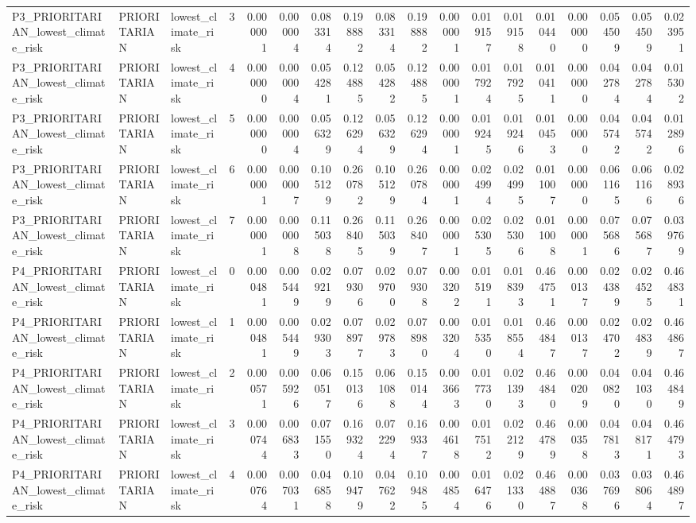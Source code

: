 \begin{tabular}{lllrrrrrrrrrrrrrrr}
P3_PRIORITARIAN_lowest_climate_risk & PRIORITARIAN & lowest_climate_risk & 3 & 0.000001 & 0.000004 & 0.083314 & 0.198882 & 0.083314 & 0.198882 & 0.000001 & 0.019157 & 0.019158 & 0.010440 & 0.000000 & 0.054509 & 0.054509 & 0.023951 \\
P3_PRIORITARIAN_lowest_climate_risk & PRIORITARIAN & lowest_climate_risk & 4 & 0.000000 & 0.000004 & 0.054281 & 0.124885 & 0.054282 & 0.124885 & 0.000001 & 0.017924 & 0.017925 & 0.010411 & 0.000000 & 0.042784 & 0.042784 & 0.015302 \\
P3_PRIORITARIAN_lowest_climate_risk & PRIORITARIAN & lowest_climate_risk & 5 & 0.000000 & 0.000004 & 0.056329 & 0.126294 & 0.056329 & 0.126294 & 0.000001 & 0.019245 & 0.019246 & 0.010453 & 0.000000 & 0.045742 & 0.045742 & 0.012896 \\
P3_PRIORITARIAN_lowest_climate_risk & PRIORITARIAN & lowest_climate_risk & 6 & 0.000001 & 0.000007 & 0.105129 & 0.260782 & 0.105129 & 0.260784 & 0.000001 & 0.024994 & 0.024995 & 0.011007 & 0.000000 & 0.061165 & 0.061166 & 0.028936 \\
P3_PRIORITARIAN_lowest_climate_risk & PRIORITARIAN & lowest_climate_risk & 7 & 0.000001 & 0.000008 & 0.115038 & 0.268405 & 0.115039 & 0.268407 & 0.000001 & 0.025305 & 0.025306 & 0.011008 & 0.000001 & 0.075686 & 0.075687 & 0.039769 \\
P4_PRIORITARIAN_lowest_climate_risk & PRIORITARIAN & lowest_climate_risk & 0 & 0.000481 & 0.005449 & 0.029219 & 0.079306 & 0.029700 & 0.079308 & 0.003202 & 0.015191 & 0.018393 & 0.464751 & 0.000137 & 0.024389 & 0.024525 & 0.464831 \\
P4_PRIORITARIAN_lowest_climate_risk & PRIORITARIAN & lowest_climate_risk & 1 & 0.000481 & 0.005449 & 0.029303 & 0.078977 & 0.029783 & 0.078980 & 0.003204 & 0.015350 & 0.018554 & 0.464847 & 0.000137 & 0.024702 & 0.024839 & 0.464867 \\
P4_PRIORITARIAN_lowest_climate_risk & PRIORITARIAN & lowest_climate_risk & 2 & 0.000571 & 0.005926 & 0.060517 & 0.150136 & 0.061088 & 0.150144 & 0.003663 & 0.017730 & 0.021393 & 0.464840 & 0.000209 & 0.040820 & 0.041030 & 0.464849 \\
P4_PRIORITARIAN_lowest_climate_risk & PRIORITARIAN & lowest_climate_risk & 3 & 0.000744 & 0.006833 & 0.071550 & 0.169324 & 0.072294 & 0.169337 & 0.004618 & 0.017512 & 0.022129 & 0.464789 & 0.000358 & 0.047813 & 0.048171 & 0.464793 \\
P4_PRIORITARIAN_lowest_climate_risk & PRIORITARIAN & lowest_climate_risk & 4 & 0.000764 & 0.007031 & 0.046858 & 0.109479 & 0.047622 & 0.109485 & 0.004854 & 0.016476 & 0.021330 & 0.464887 & 0.000368 & 0.037696 & 0.038064 & 0.464897 \\

\end{tabular}
